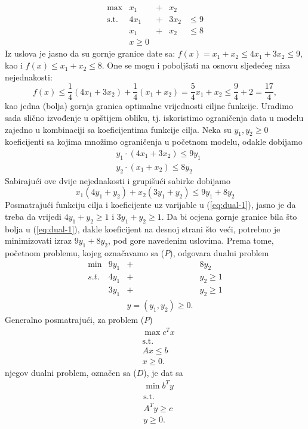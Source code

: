 \documentclass[a4paper, utf8, 11pt, colorlinks]{book}
\begin{document}
$$ 
\begin{array}{lllll}
    \max                  &x_1 &+& x_2   &               \\
    \mbox{s.t.}  &4x_1 & +&3 x_2 & \leq 9        \\
                          &x_1 &+ &x_2   &  \leq 8       \\
                          &x \geq 0  &  &     &      
 \end{array}
$$
Iz uslova je jasno da su gornje granice date sa: $f(x) = x_1 + x_2 \leq 4 x_1 + 3 x_2 \leq 9$, kao i 
$f(x) \leq x_1 + x_2 \leq 8$. One se mogu i poboljšati na osnovu sljedećeg niza nejednakosti:
$$f(x) \leq \frac{1}{4}(  4 x_1 + 3 x_2  ) + \frac{1}{4}(    x_1 +   x_2 ) = \frac{5}{4}x_1 + x_2 \leq  \frac{9}{4} + 2 = \frac{17}{4},$$ kao jedna (bolja) gornja granica optimalne vrijednosti ciljne funkcije. 
Uradimo sada slično izvođenje u opštijem obliku, tj. iskoristimo ograničenja data u modelu zajedno u kombinaciji sa koeficijentima funkcije cilja. Neka su $y_1, y_2 \geq 0$ koeficijenti sa kojima množimo ograničenja u početnom modelu, odakle dobijamo 
\begin{align*}
    &y_1 \cdot (4x_1 + 3x_2) \leq 9 y_1 \\
    &y_2 \cdot (x_1 + x_2 ) \leq 8 y_2 
\end{align*}
Sabirajući ove dvije nejednakosti i grupišući sabirke dobijamo 
\begin{equation}\label{eq:dual-1}
     x_1 ( 4 y_1 + y_2 ) + x_2 ( 3 y_1 + y_2 ) \leq 9 y_1 + 8 y_2 
\end{equation}
Posmatrajući funkciju cilja i koeficijente uz varijable u (\ref{eq:dual-1}), jasno je da treba da vrijedi 
$4 y_1 + y_2 \geq 1$ i $3 y_1 + y_2 \geq 1$. Da bi ocjena gornje granice bila što bolja u (\ref{eq:dual-1}), dakle koeficijent na desnoj strani što veći, potrebno je minimizovati izraz $9y_1 + 8 y_2$, pod gore navedenim uslovima. Prema tome, početnom problemu, kojeg označavamo sa ($P$), odgovara dualni problem 
$$\begin{array}{cccc}
     \min                    &  9 y_1 &+& 8 y_2        \\
     {s.t. }     &  4 y_1    & +  & y_2 \geq 1   \\
                             &  3 y_1 &+& y_2 \geq 1 \\
                 &           &y=(y_1,y_2) \geq 0.  & 
\end{array}$$
Generalno posmatrajući,  za problem ($P$) %
\begin{align}
	& \max c^T x  \\
	& \mbox{s.t.} \nonumber \\
	& A x \leq b \\
	& x \geq 0.
\end{align}
njegov dualni problem, označen sa ($D$), je dat sa 
\begin{align}
     & \min b^T y  \\
     & \mbox{s.t.} \nonumber \\
     & A^T y \geq c \\
     & y \geq 0.
\end{align}
\end{document}
